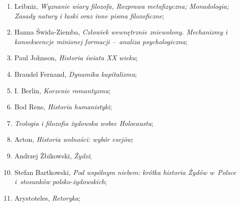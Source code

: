 \documentclass[a4paper,11pt]{article}
\begin{document}
\begin{enumerate}
\item Leibniz, \emph{Wyznanie wiary filozofa, Rozprawa metafizyczna;
    Monadologia; Zasady natury i łaski oraz inne pisma filozoficzne};

\item Hanna Świda-Ziemba, \emph{Człowiek wewnętrznie zniewolony.
    Mechanizmy i konsekwencje minionej formacji --~analiza
    psychologiczna};

\item Paul Johnson, \emph{Historia świata XX wieku};

\item Braudel Fernand, \emph{Dynamika kapitalizmu};

\item I. Berlin, \emph{Korzenie romantyzmu};

\item Bod Rens, \emph{Historia humanistyki};

\item \emph{Teologia i filozofia żydowska wobec Holocaustu};

\item Acton, \emph{Historia wolności: wybór esejów};

\item Andrzej Żbikowski, \emph{Żydzi};

\item Stefan Bartkowski, \emph{Pod wspólnym niebem: krótka historia
    Żydów w~Polsce i~stosunków polsko-żydowskich};

\item Arystoteles, \emph{Retoryka};


\end{enumerate}
\end{document}
